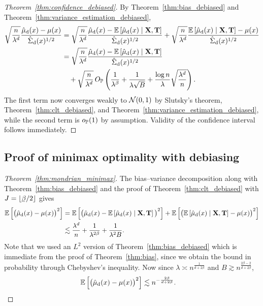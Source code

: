 \begin{proof}[Theorem~\ref{thm:confidence_debiased}]
  By Theorem~\ref{thm:bias_debiased}
  and Theorem~\ref{thm:variance_estimation_debiased},
  \begin{align*}
    \sqrt{\frac{n}{\lambda^d}}
    \frac{\hat \mu_\rd(x) - \mu(x)}{\hat \Sigma_\rd(x)^{1/2}}
    &=
    \sqrt{\frac{n}{\lambda^d}}
    \frac{\hat \mu_\rd(x) - \E \left[ \hat \mu_\rd(x) \mid \bX, \bT \right]}
    {\hat \Sigma_\rd(x)^{1/2}}
    + \sqrt{\frac{n}{\lambda^d}}
    \frac{\E \left[ \hat \mu_\rd(x) \mid \bX, \bT \right] - \mu(x)}
    {\hat \Sigma_\rd(x)^{1/2}} \\
    &=
    \sqrt{\frac{n}{\lambda^d}}
    \frac{\hat \mu_\rd(x) - \E \left[ \hat \mu_\rd(x) \mid \bX, \bT \right]}
    {\hat \Sigma_\rd(x)^{1/2}} \\
    &\quad+
    \sqrt{\frac{n}{\lambda^d}} \,
    O_\P \left(
      \frac{1}{\lambda^\beta}
      + \frac{1}{\lambda \sqrt B}
      + \frac{\log n}{\lambda} \sqrt{\frac{\lambda^d}{n}}
    \right).
  \end{align*}
  The first term now converges weakly to $\cN(0,1)$ by
  Slutsky's theorem, Theorem~\ref{thm:clt_debiased},
  and Theorem~\ref{thm:variance_estimation_debiased},
  while the second term is $o_\P(1)$ by assumption.
  Validity of the confidence interval follows immediately.
\end{proof}

\subsection*{Proof of minimax optimality with debiasing}

\begin{proof}[Theorem~\ref{thm:mondrian_minimax}]

  The bias--variance decomposition along with
  Theorem~\ref{thm:bias_debiased}
  and the proof of Theorem~\ref{thm:clt_debiased}
  with $J = \lfloor \flbeta / 2 \rfloor$ gives
  \begin{align*}
    \E \left[
      \big(
        \hat \mu_\rd(x)
        - \mu(x)
      \big)^2
    \right]
    &=
    \E \left[
      \big(
        \hat \mu_\rd(x)
        - \E \left[ \hat \mu_\rd(x) \mid \bX, \bT \right]
      \big)^2
    \right]
    + \E \left[
      \big(
        \E \left[ \hat \mu_\rd(x) \mid \bX, \bT \right]
        - \mu(x)
      \big)^2
    \right] \\
    &\lesssim
    \frac{\lambda^d}{n}
    + \frac{1}{\lambda^{2\beta}}
    + \frac{1}{\lambda^2 B}.
  \end{align*}
  Note that we used an $L^2$ version of Theorem~\ref{thm:bias_debiased}
  which is immediate from the proof of Theorem~\ref{thm:bias},
  since we obtain the bound in probability through
  Chebyshev's inequality.
  Now since
  $\lambda \asymp n^{\frac{1}{d + 2 \beta}}$
  and
  $B \gtrsim n^{\frac{2 \beta - 2}{d + 2 \beta}}$,
  \begin{align*}
    \E \left[
      \big(
        \hat \mu_\rd(x)
        - \mu(x)
      \big)^2
    \right]
    &\lesssim
    n^{-\frac{2\beta}{d + 2 \beta}}.
  \end{align*}
\end{proof}

